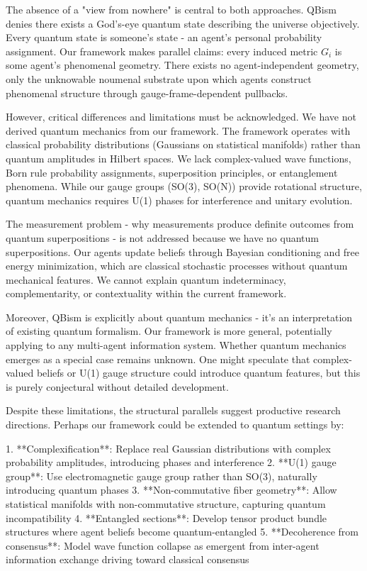 \documentclass[11pt]{article}
\begin{document}
The absence of a "view from nowhere" is central to both approaches. QBism denies there exists a God's-eye quantum state describing the universe objectively. Every quantum state is someone's state - an agent's personal probability assignment. Our framework makes parallel claims: every induced metric $G_i$ is some agent's phenomenal geometry. There exists no agent-independent geometry, only the unknowable noumenal substrate upon which agents construct phenomenal structure through gauge-frame-dependent pullbacks.

However, critical differences and limitations must be acknowledged. We have not derived quantum mechanics from our framework. The framework operates with classical probability distributions (Gaussians on statistical manifolds) rather than quantum amplitudes in Hilbert spaces. We lack complex-valued wave functions, Born rule probability assignments, superposition principles, or entanglement phenomena. While our gauge groups (SO(3), SO(N)) provide rotational structure, quantum mechanics requires U(1) phases for interference and unitary evolution.

The measurement problem - why measurements produce definite outcomes from quantum superpositions - is not addressed because we have no quantum superpositions. Our agents update beliefs through Bayesian conditioning and free energy minimization, which are classical stochastic processes without quantum mechanical features. We cannot explain quantum indeterminacy, complementarity, or contextuality within the current framework.

Moreover, QBism is explicitly about quantum mechanics - it's an interpretation of existing quantum formalism. Our framework is more general, potentially applying to any multi-agent information system. Whether quantum mechanics emerges as a special case remains unknown. One might speculate that complex-valued beliefs or U(1) gauge structure could introduce quantum features, but this is purely conjectural without detailed development.

Despite these limitations, the structural parallels suggest productive research directions. Perhaps our framework could be extended to quantum settings by:

1. **Complexification**: Replace real Gaussian distributions with complex probability amplitudes, introducing phases and interference
2. **U(1) gauge group**: Use electromagnetic gauge group rather than SO(3), naturally introducing quantum phases
3. **Non-commutative fiber geometry**: Allow statistical manifolds with non-commutative structure, capturing quantum incompatibility
4. **Entangled sections**: Develop tensor product bundle structures where agent beliefs become quantum-entangled
5. **Decoherence from consensus**: Model wave function collapse as emergent from inter-agent information exchange driving toward classical consensus
\end{document}
